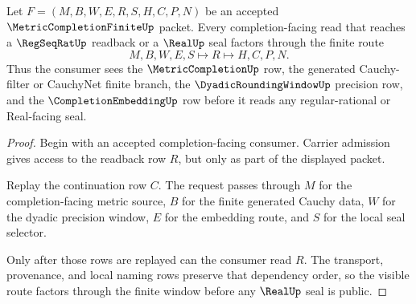 \begin{theorem}
\label{thm:metric-completion-finite-window-readback}
Let $F=(M,B,W,E,R,S,H,C,P,N)$ be an accepted $\MetricCompletionFiniteUp$ packet. Every completion-facing read that reaches a $\RegSeqRatUp$ readback or a $\RealUp$ seal factors through the finite route
$$
M,B,W,E,S \longmapsto R \longmapsto H,C,P,N .
$$
Thus the consumer sees the $\MetricCompletionUp$ row, the generated Cauchy-filter or CauchyNet finite branch, the $\DyadicRoundingWindowUp$ precision row, and the $\CompletionEmbeddingUp$ row before it reads any regular-rational or Real-facing seal.
\end{theorem}
\begin{proof}
Begin with an accepted completion-facing consumer. Carrier admission gives access to the readback row $R$, but only as part of the displayed packet.

Replay the continuation row $C$. The request passes through $M$ for the completion-facing metric source, $B$ for the finite generated Cauchy data, $W$ for the dyadic precision window, $E$ for the embedding route, and $S$ for the local seal selector.

Only after those rows are replayed can the consumer read $R$. The transport, provenance, and local naming rows preserve that dependency order, so the visible route factors through the finite window before any $\RealUp$ seal is public.
\end{proof}

